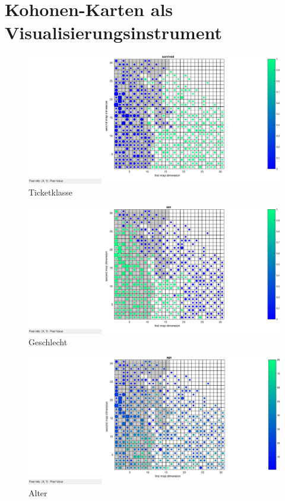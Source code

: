 \documentclass[DIN, pagenumber=false, fontsize=11pt, parskip=half]{scrartcl}
\begin{document}
    \section{Kohonen-Karten als Visualisierungsinstrument}
    
    \begin{figure}
        \centering
        \includegraphics[width=\textwidth]{pclass.eps}
        \caption{Ticketklasse}
    \end{figure}
    \begin{figure}
        \centering
        \includegraphics[width=\textwidth]{sex.eps}
        \caption{Geschlecht}
    \end{figure}
    \begin{figure}
        \centering
        \includegraphics[width=\textwidth]{age.eps}
        \caption{Alter}
    \end{figure}
\end{document}
